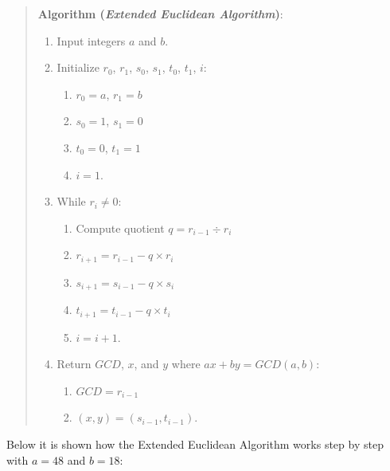 \documentclass[
  letterpaper,
  DIV=11,
  numbers=noendperiod,
  oneside]{scrartcl}
\providecommand{\tightlist}{%
  \setlength{\itemsep}{0pt}\setlength{\parskip}{0pt}}\usepackage{longtable,booktabs,array}
\begin{document}
\begin{quote}
\textbf{Algorithm (\emph{Extended Euclidean Algorithm})}:

\begin{enumerate}
\def\labelenumi{\arabic{enumi}.}
\item
  Input integers \(a\) and \(b\).
\item
  Initialize \(r_0\), \(r_1\), \(s_0\), \(s_1\), \(t_0\), \(t_1\),
  \(i\):

  \begin{enumerate}
  \def\labelenumii{\arabic{enumii}.}
  \tightlist
  \item
    \(r_0 = a\), \(r_1 = b\)
  \item
    \(s_0 = 1\), \(s_1 = 0\)
  \item
    \(t_0 = 0\), \(t_1 = 1\)
  \item
    \(i = 1\).
  \end{enumerate}
\item
  While \(r_i \neq 0\):

  \begin{enumerate}
  \def\labelenumii{\arabic{enumii}.}
  \tightlist
  \item
    Compute quotient \(q = r_{i-1} \div r_i\)
  \item
    \(r_{i+1} = r_{i-1} - q \times r_i\)
  \item
    \(s_{i+1} = s_{i-1} - q \times s_i\)
  \item
    \(t_{i+1} = t_{i-1} - q \times t_i\)
  \item
    \(i = i + 1\).
  \end{enumerate}
\item
  Return \(GCD\), \(x\), and \(y\) where \(ax + by = GCD(a,b)\):

  \begin{enumerate}
  \def\labelenumii{\arabic{enumii}.}
  \tightlist
  \item
    \(GCD = r_{i-1}\)
  \item
    \((x,y) = (s_{i-1}, t_{i-1})\).
  \end{enumerate}
\end{enumerate}
\end{quote}

Below it is shown how the Extended Euclidean Algorithm works step by
step with \(a = 48\) and \(b = 18\):
\end{document}
